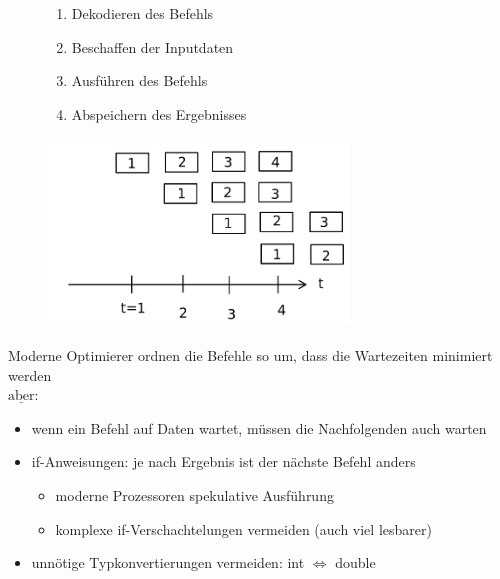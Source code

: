 \documentclass[11pt, fleqn]{scrreprt}
\begin{document}
	\begin{figure}[htbp]
		\begin{minipage}[t]{7cm}
			\vspace*{-2cm}
			\begin{enumerate}
				\item Dekodieren des Befehls
				\item Beschaffen der Inputdaten
				\item Ausführen des Befehls
				\item Abspeichern des Ergebnisses
			\end{enumerate}
		\end{minipage}
		\begin{minipage}{6cm}
		\includegraphics[width=8cm,height=5cm,keepaspectratio]{./Pictures/Pipeline.png}
		\end{minipage}
	\end{figure}
	\vspace*{-0.8cm}
	Moderne Optimierer ordnen die Befehle so um, dass die Wartezeiten minimiert werden\\
	$\underline{\text{aber}}$: 
	\begin{itemize}
		\item wenn ein Befehl auf Daten wartet, müssen die Nachfolgenden auch warten
		\item if-Anweisungen: je nach Ergebnis ist der nächste Befehl anders
		\begin{itemize}[label={$\Rightarrow$}]
			\item moderne Prozessoren \glqq spekulative Ausführung\grqq
			\item komplexe if-Verschachtelungen vermeiden (auch viel lesbarer)
		\end{itemize}
		\item unnötige Typkonvertierungen vermeiden: int $\Leftrightarrow$ double
	\end{itemize}
\end{document}
